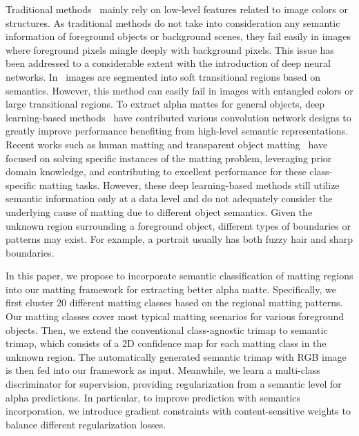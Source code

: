 \documentclass[10pt,twocolumn,letterpaper]{article}
\begin{document}
Traditional methods~\cite{Chuang-2001-CVPR-bayesianmatting,Feng-2016-ECCV-clustersampling,GastalOliveira-2010-CGF-SharedMatting,He-2011-cvpr-globalsampling,Ruzon-2000-cvpr-alphaestimation, Aksoy-2017-cvpr-ifm,bai-iccv-geodesicframework,Chen-2012-PAMI-knnmatting,grady2005random,levin2008closed,levin2008spectral}  mainly rely on low-level features related to image colors or structures. As traditional methods do not take into consideration any semantic information of foreground objects or background scenes, they fail easily in images where foreground pixels mingle deeply with background pixels. This issue has been addressed to a considerable extent with the introduction of deep neural networks. In~\cite{Aksoy-2018-tg-sss} images are segmented into soft transitional regions based on semantics. However, this method can easily fail in images with entangled colors or large transitional regions. To extract alpha mattes for general objects, deep learning-based methods~\cite{Cho-2016-mattingusingdeepcnn, Xu2017DeepIM, Lutz2018AlphaGANGA, cai2019disentangled, hou2019context, li2020natural} have contributed  various convolution network designs to greatly improve performance benefiting from high-level semantic representations. Recent works such as human matting and transparent object matting~\cite{Shen2016DeepAP, zhu2017fastdeepmattingportrait, Liu_2020_CVPR, chen2018tomnet} have focused on solving specific instances of the matting problem, leveraging prior domain knowledge, and contributing to excellent performance for these class-specific matting tasks.
However, these deep learning-based methods still utilize semantic information only at a data level and do not adequately consider the underlying cause of matting due to different object semantics. Given the unknown region surrounding a foreground object, different types of boundaries or patterns may exist. For example, a portrait usually has both fuzzy hair and sharp boundaries. 

In this paper, we propose to incorporate semantic classification of matting regions into our matting framework for extracting better alpha matte. Specifically, we first cluster 20 different matting classes based on the regional matting patterns. Our matting classes cover most typical matting scenarios for various foreground objects. Then, we extend the conventional class-agnostic trimap to semantic trimap, which consists of a 2D confidence map for each matting class in the unknown region. The automatically generated semantic trimap with RGB image is then fed into our framework as input. Meanwhile, we learn a multi-class discriminator for supervision, providing  regularization from a semantic level for alpha predictions. In particular, to improve prediction with semantics incorporation, we introduce gradient constraints with content-sensitive weights to balance different regularization losses. 
\end{document}
